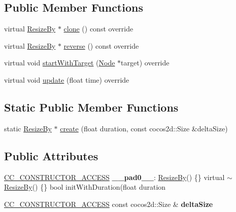 \subsection*{Public Member Functions}
\begin{DoxyCompactItemize}
\item 
virtual \hyperlink{classResizeBy}{Resize\+By} $\ast$ \hyperlink{classResizeBy_a77547588c32d16183c06c175963475fc}{clone} () const override
\item 
virtual \hyperlink{classResizeBy}{Resize\+By} $\ast$ \hyperlink{classResizeBy_a8eb9541a2fd900fba35408ed5f432735}{reverse} () const override
\item 
virtual void \hyperlink{classResizeBy_ad13f3b670bd86ef939ce97460baeb8bd}{start\+With\+Target} (\hyperlink{classNode}{Node} $\ast$target) override
\item 
virtual void \hyperlink{classResizeBy_aa04b69df4e3c06baba3141932dbd0d2e}{update} (float time) override
\end{DoxyCompactItemize}
\subsection*{Static Public Member Functions}
\begin{DoxyCompactItemize}
\item 
static \hyperlink{classResizeBy}{Resize\+By} $\ast$ \hyperlink{classResizeBy_adc08cae1c4c196456a484b2bb68346d8}{create} (float duration, const cocos2d\+::\+Size \&delta\+Size)
\end{DoxyCompactItemize}
\subsection*{Public Attributes}
\begin{DoxyCompactItemize}
\item 
\mbox{\label{classResizeBy_ab7b94845999050c22eeeb3ebce1946ee}} 
\hyperlink{_2cocos2d_2cocos_2base_2ccConfig_8h_a25ef1314f97c35a2ed3d029b0ead6da0}{C\+C\+\_\+\+C\+O\+N\+S\+T\+R\+U\+C\+T\+O\+R\+\_\+\+A\+C\+C\+E\+SS} {\bfseries \+\_\+\+\_\+pad0\+\_\+\+\_\+}\+: \hyperlink{classResizeBy}{Resize\+By}() \{\} virtual $\sim$\hyperlink{classResizeBy}{Resize\+By}() \{\} bool init\+With\+Duration(float duration
\item 
\mbox{\label{classResizeBy_a6cba7bf3376bb2cf6cbb958df361ca45}} 
\hyperlink{_2cocos2d_2cocos_2base_2ccConfig_8h_a25ef1314f97c35a2ed3d029b0ead6da0}{C\+C\+\_\+\+C\+O\+N\+S\+T\+R\+U\+C\+T\+O\+R\+\_\+\+A\+C\+C\+E\+SS} const cocos2d\+::\+Size \& {\bfseries delta\+Size}
\end{DoxyCompactItemize}
